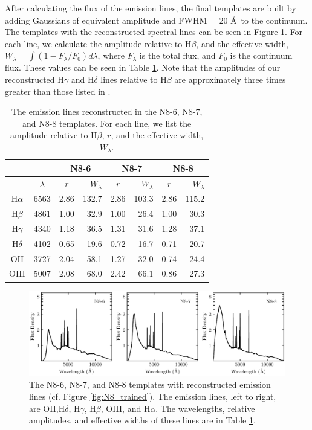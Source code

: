 After calculating the flux of the emission lines, the final templates are built by adding Gaussians of equivalent amplitude and FWHM = 20 \AA\ to the continuum. 
The templates with the reconstructed spectral lines can be seen in Figure \ref{fig:speclines}.
For each line, we calculate the amplitude relative to H$\beta$, and the effective width, $W_\lambda = \int (1 - F_\lambda/F_0) d\lambda$, where $F_\lambda$ is the total flux, and $F_0$ is the continuum flux.
These values can be seen in Table \ref{tab:speclines}.
Note that the amplitudes of our reconstructed H$\gamma$ and H$\delta$ lines relative to H$\beta$ are approximately three times greater than those listed in \citet{Groves2012a}.

\begin{table}
    \centering
    \caption{The emission lines reconstructed in the N8-6, N8-7, and N8-8 templates. For each line, we list the amplitude relative to H$\beta$, $r$, and the effective width, $W_\lambda$.}
    \begin{tabular}{c c | c r | c r | c r }
        \hline \hline
         & & \multicolumn{2}{c|}{N8-6} & \multicolumn{2}{c|}{N8-7} & \multicolumn{2}{c}{N8-8} \\
        \hline
         & $\lambda$ & $r$ & $W_\lambda$ & $r$ & $W_\lambda$ & $r$ & $W_\lambda$ \\
        \hline
        H$\alpha$ & 6563 & 2.86 & 132.7 & 2.86 & 103.3 & 2.86 & 115.2 \\
        H$\beta$  & 4861 & 1.00 &  32.9 & 1.00 &  26.4 & 1.00 &  30.3 \\
        H$\gamma$ & 4340 & 1.18 &  36.5 & 1.31 &  31.6 & 1.28 &  37.1 \\
        H$\delta$ & 4102 & 0.65 &  19.6 & 0.72 &  16.7 & 0.71 &  20.7 \\
        OII       & 3727 & 2.04 &  58.1 & 1.27 &  32.0 & 0.74 &  24.4 \\
        OIII      & 5007 & 2.08 &  68.0 & 2.42 &  66.1 & 0.86 &  27.3 \\

        \hline
    \end{tabular}
    \label{tab:speclines}
\end{table}

\begin{figure}
    \centering
    \includegraphics{figures/N8_spectral_lines.pdf}
    \caption{The N8-6, N8-7, and N8-8 templates with reconstructed emission lines (cf. Figure \ref{fig:N8_trained}). The emission lines, left to right, are OII,H$\delta$, H$\gamma$, H$\beta$, OIII, and H$\alpha$. The wavelengths, relative amplitudes, and effective widths of these lines are in Table \ref{tab:speclines}.}
    \label{fig:speclines}
\end{figure}